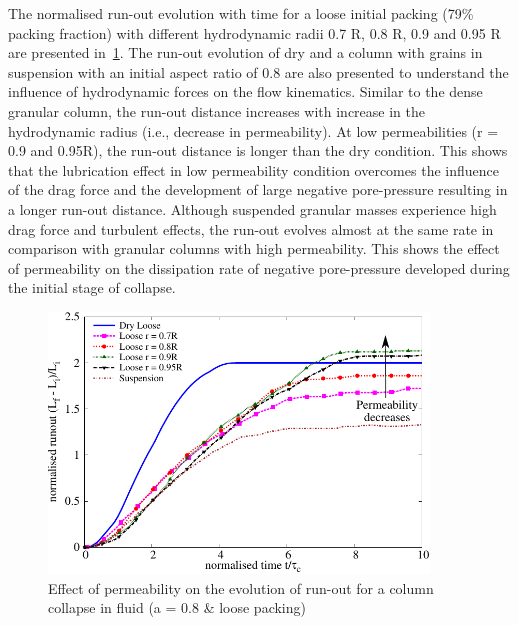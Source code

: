 The normalised run-out evolution with time for a loose initial packing (79\% 
packing fraction) with different hydrodynamic radii 0.7 R, 0.8 R, 0.9 and 0.95 
R are presented in~\cref{fig:Runout_a08_loose}. The run-out evolution of dry 
and a column with grains in suspension with an 
initial aspect ratio of 0.8 are also presented to understand the influence of 
hydrodynamic forces on the flow kinematics. Similar to the dense granular 
column, the run-out distance increases with increase in the hydrodynamic radius 
(i.e., decrease in permeability). At low permeabilities (r = 0.9 and 0.95R), 
the run-out distance is longer than the dry condition. This shows that the 
lubrication effect in low permeability condition overcomes the influence of 
the drag force and the development of large negative pore-pressure resulting in 
a longer run-out distance. Although suspended granular masses experience high 
drag 
force and turbulent effects, the run-out evolves almost at the same rate in 
comparison with granular columns with high permeability. This shows the effect 
of permeability on the dissipation rate of negative pore-pressure developed 
during the initial stage of collapse.

\begin{figure}
\centering
\includegraphics[width=0.9\textwidth]{Runout_a08_loose}
\caption{Effect of permeability on the evolution of run-out for a column 
collapse in fluid (a = 0.8 \& loose packing)}
\label{fig:Runout_a08_loose}
\end{figure}

